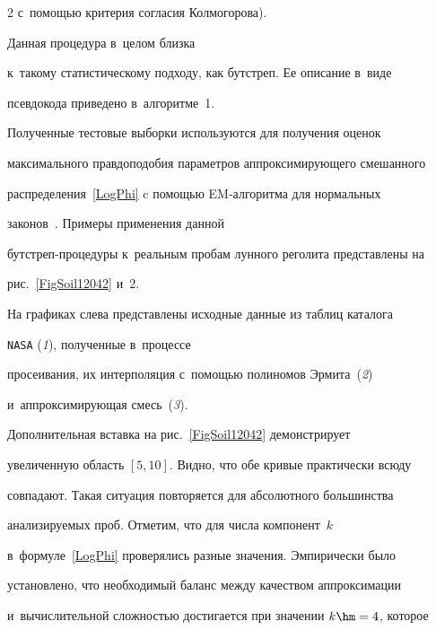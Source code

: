 \begin{multicols}{2}
с~помощью критерия согласия Колмогорова). 


%


Данная процедура в~целом близка 


к~такому статистическому подходу, как бутстреп. Ее описание в~виде 


псевдокода приведено в~алгоритме~1.














Полученные тестовые выборки используются для получения оценок 


максимального правдоподобия параметров аппроксимирующего смешанного 


распределения~\eqref{LogPhi} c помощью EM-алгоритма для нормальных 


законов~\cite{Korolev2011}. Примеры применения данной 


бут\-стреп-про\-це\-ду\-ры к~реальным пробам лунного реголита представлены на 


рис.~\ref{FigSoil12042} и~2.














На графиках слева представлены исходные данные из таблиц каталога 


\verb"NASA" (\textit{1}), полученные в~процессе 


просеивания, их интерполяция с~по\-мощью полиномов Эрмита~(\textit{2}) 


и~аппроксимиру\-ющая смесь~(\textit{3}). 


Дополнительная вставка на рис.~\ref{FigSoil12042} демонстрирует 


увеличенную область $[5,10]$. Видно, что обе кривые практически всюду 


совпадают. Такая ситуация повторяется для абсолютного большинства 


анализируемых проб. Отметим, что для числа компонент~$k$ 


в~формуле~\eqref{LogPhi} проверялись разные значения. Эмпирически было 


установлено, что необходимый баланс между качеством аппроксимации 


и~вычислительной сложностью достигается при значении $k\hm=4$, которое 



\end{multicols}

